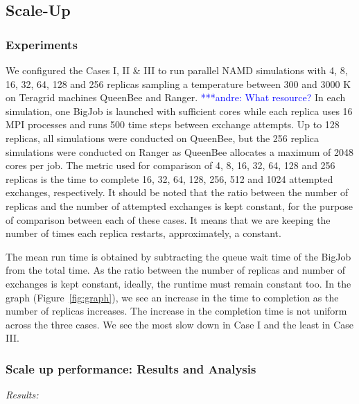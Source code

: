 \documentclass{rspublic}
\newcommand{\alnote}[1]{ {\textcolor{blue} { ***andre: #1 }}}
\newcommand{\alnote}[1]{}
\begin{document}

\subsection{Scale-Up}

\subsubsection{Experiments}
We configured the Cases I, II \& III to run parallel NAMD simulations with 4, 8, 16, 32, 64, 128 and 256 replicas sampling a temperature between 300 and 3000 K on Teragrid machines QueenBee and Ranger. \alnote{What resource?} In each simulation, one BigJob is launched with sufficient cores while each replica uses 16 MPI processes and runs 500 time steps between exchange attempts. Up to 128 replicas, all simulations were conducted on QueenBee, but the 256 replica simulations were conducted on Ranger as QueenBee allocates a maximum of 2048 cores per job. The metric used for comparison of 4, 8, 16, 32, 64, 128 and 256 replicas is the time to complete 16, 32, 64, 128, 256, 512 and 1024 attempted exchanges, respectively. It should be noted that the ratio between the number of replicas and the number of attempted exchanges is kept constant, for the purpose of comparison between each of these cases. It means that we are keeping the number of times each replica restarts, approximately, a constant. 

The mean run time is obtained by subtracting the queue wait time of the BigJob from the total time. As the ratio between the number of replicas and number of exchanges is kept constant, ideally, the runtime must remain constant too. In the graph (Figure~\ref{fig:graph}), we see an increase in the time to completion as the number of replicas increases. The increase in the completion time is not uniform across the three cases. We see the most slow down in Case I and the least in Case III.

\subsubsection{Scale up performance: Results and Analysis}

{\it Results:}\\
\end{document}
